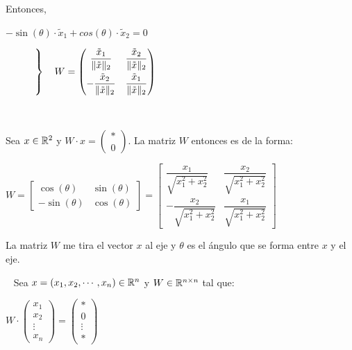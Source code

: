 \documentclass[]{article}
\begin{document}
Entonces,

$-\sin(\theta)\cdot \tilde x_1 + cos(\theta)\cdot \tilde x_2 = 0$

~\newline
{}
{$\left.
\begin{array}{ll}
 &  \\
 & \\
 & \\
 & \\
\end{array}
\right\}
\vspace{-0.2cm} \ \ \ W = \displaystyle \begin{pmatrix}
	\dfrac{\tilde x_1}{\|\tilde x\|_2} & \dfrac{\tilde x_2}{\|\tilde x\|_2} \\[9pt]
	-\dfrac{\tilde x_2}{\|\tilde x\|_2} &\dfrac{\tilde x_1}{\|\tilde x\|_2}
\end{pmatrix}$}

~\newline

Sea $x\in\mathbb{R}^2$ y $W\cdot x = \begin{pmatrix}* \\ 0\end{pmatrix}$. La matriz $W$ entonces es de la forma:
\begin{center}
	$W=\begin{bmatrix}
		\cos(\theta) & \sin(\theta)\\
		-\sin(\theta) & \cos(\theta)
	\end{bmatrix} = \begin{bmatrix}
		\dfrac{x_1}{\sqrt{x_1^2+x_2^2}} & \dfrac{x_2}{\sqrt{x_1^2+x_2^2}} \\
		-\dfrac{x_2}{\sqrt{x_1^2+x_2^2}} & \dfrac{x_1}{\sqrt{x_1^2+x_2^2}}
	\end{bmatrix}$
\end{center}

La matriz $W$ me tira el vector $x$ al eje y $\theta$ es el ángulo que se forma entre $x$ y el eje.

~\newline
Sea $x = (x_1,x_2,\cdots,x_n)\in\mathbb{R}^n$ y $W\in\mathbb{R}^{n\times n}$ tal que:
\begin{center}
	$W\cdot \begin{pmatrix}x_1\\x_2\\\vdots\\x_n\end{pmatrix} = \begin{pmatrix}* \\ 0 \\ \vdots \\ * \end{pmatrix}$
\end{center}
\end{document}
